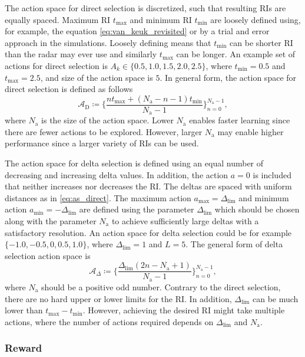 \documentclass[english, 12pt, a4paper, elec, utf8, a-1b, online]{aaltothesis}
\newcommand{\amax}{a_\text{max}}
\newcommand{\amin}{a_\text{min}}
\newcommand{\As}{\mathcal{A}}
\newcommand{\tmax}{t_\text{max}}
\newcommand{\tmin}{t_\text{min}}
\newcommand{\deltalim}{\Delta_\text{lim}}
\newcommand{\Asdir}{\As_\text{D}}
\newcommand{\Asdelta}{\As_\Delta}
\newcommand{\nacts}{{N_\text{a}}}
\begin{document}
The action space for direct selection is discretized, such that resulting RIs are equally spaced.
Maximum RI $\tmax$ and minimum RI $\tmin$ are loosely defined using, for example, the equation \eqref{eq:van_keuk_revisited} or by a trial and error approach in the simulations. 
Loosely defining means that $\tmin$ can be shorter RI than the radar may ever use and similarly $\tmax$ can be longer.
An example set of actions for direct selection is $A_k \in \{0.5, 1.0, 1.5, 2.0, 2.5\}$, where $\tmin=0.5$ and $\tmax=2.5$, and size of the action space is $5$.
In general form, the action space for direct selection is defined as follows
\begin{equation}\label{eq:as_direct}
    \Asdir \coloneqq \{ \frac{n \tmax + (\nacts-n-1) \tmin}{\nacts-1} \}_{n=0}^{\nacts-1},    
\end{equation}
where $\nacts$ is the size of the action space.
Lower $\nacts$ enables faster learning since there are fewer actions to be explored.
However, larger $\nacts$ may enable higher performance since a larger variety of RIs can be used.

The action space for delta selection is defined using an equal number of decreasing and increasing delta values. 
In addition, the action $a=0$ is included that neither increases nor decreases the RI.
The deltas are spaced with uniform distances as in \eqref{eq:as_direct}.
The maximum action $\amax=\deltalim$ and minimum action $\amin=-\deltalim$ are defined using the parameter $\deltalim$ which should be chosen along with the parameter $\nacts$ to achieve sufficiently large deltas with a satisfactory resolution.
An action space for delta selection could be for example $\{ -1.0, -0.5, 0, 0.5, 1.0 \}$, where $\deltalim=1$ and $L=5$.
The general form of delta selection action space is
\begin{equation}\label{eq:as_delta}
    \Asdelta \coloneqq \{ \frac{\deltalim \left( 2 n - \nacts + 1 \right)}{\nacts-1} \}_{n=0}^{\nacts-1},
\end{equation}
where $\nacts$ should be a positive odd number.
Contrary to the direct selection, there are no hard upper or lower limits for the RI.
In addition, $\deltalim$ can be much lower than $\tmax - \tmin$.
However, achieving the desired RI might take multiple actions, where the number of actions required depends on $\deltalim$ and $\nacts$.

\subsubsection{Reward} \label{sec:rewards}
\end{document}
